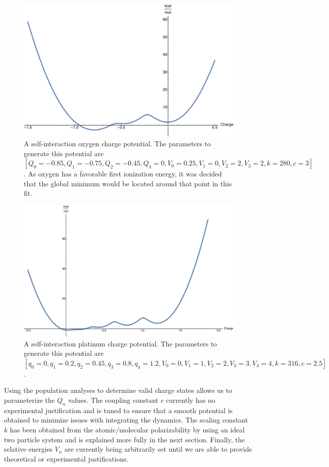 \begin{figure}
  \centering
  \includegraphics[width=0.75\linewidth]{../figures/chap5/Oxygen_Charge_Testing.pdf}
  \caption{A self-interaction oxygen charge potential. The parameters to
generate this potential are $[Q_0 = -0.85, Q_1 = -0.75, Q_2 = -0.45, Q_3 = 0,
V_0 = 0.25, V_1 = 0, V_2 = 2, V_3 = 2, k = 280, c = 3]$. As oxygen has a
favorable first ionization energy, it was decided that the global minimum
would be located around that point in this fit.}
\label{fig:Ocharge}
\end{figure}

\begin{figure}
  \centering
  \includegraphics[width=0.75\linewidth]{../figures/chap5/Pt_Charge_Testing.pdf}
  \caption{A self-interaction platinum charge potential. The parameters to
generate this potential are $[q_0 = 0, q_1 = 0.2, q_2 = 0.45, q_3 = 0.8, q_4 =
1.2, V_0 = 0, V_1 = 1, V_2 = 2, V_3 = 3, V_4 = 4, k = 316, c = 2.5]$.}
\label{fig:PtCharge}
\end{figure}

Using the population analyses to determine valid charge states allows us to
parameterize the $Q_n$ values. The coupling constant $c$ currently has no
experimental justification and is tuned to ensure that a smooth potential is
obtained to minimize issues with integrating the dynamics. The scaling constant
$k$ has been obtained from the atomic/molecular polarizability by using an
ideal two particle system and is explained more fully in the next section.
Finally, the relative energies $V_n$ are currently being arbitrarily set until
we are able to provide theoretical or experimental justifications.

